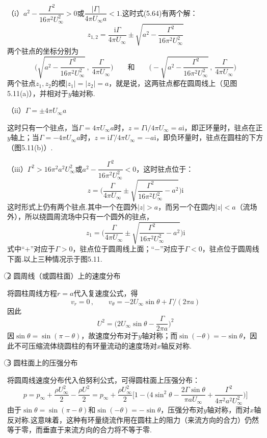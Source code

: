 （i）$a^{2}-\dfrac{\Gamma^{2}}{16\pi^{2}U_\infty^{2}}>0$或$\dfrac{|\Gamma|}{4\pi U_\infty a}<1$.这时式(5.64)有两个解：
\[
z_{1,2}=\frac{\mathrm{i}\Gamma}{4\pi U_\infty}\pm\sqrt{a^{2}-\frac{\Gamma^{2}}{16\pi^{2}U_\infty^{2}}}
\]
两个驻点的坐标分别为
\[
\Big(\sqrt{a^{2}-\frac{\Gamma^{2}}{16\pi^{2}U_\infty^{2}}}\,,\ \frac{\Gamma}{4\pi U_\infty}\Big)\qquad\text{和}\qquad\Big(-\sqrt{a^{2}-\frac{\Gamma^{2}}{16\pi^{2}U_\infty^{2}}}\,,\ \frac{\Gamma}{4\pi U_\infty}\Big)
\]
两个驻点$z_1,z_2$的模$|z_1|=|z_2|=a$，就是说，这两驻点都在圆周线上（见图5.11(a)），并相对于$y$轴对称.

（ii）$\Gamma=\pm 4\pi U_\infty a$

这时只有一个驻点，当$\Gamma=4\pi U_\infty a$时，$z=\Gamma\mathrm{i}/4\pi U_\infty=a\mathrm{i}$，即正环量时，驻点在正$y$轴上；当$\Gamma=-4\pi U_\infty a$时，$z=\mathrm{i}\Gamma/4\pi U_\infty=-a\mathrm{i}$，即负环量时，驻点在圆柱的下方（图5.11(b)）.

（iii）$\Gamma^{2}>16\pi^{2}a^{2}U_\infty^{2}$或$a^{2}-\dfrac{\Gamma^{2}}{16\pi^{2}U_\infty^{2}}<0$，这时驻点位于：
\[
z=\Big(\frac{\Gamma}{4\pi U_\infty}\pm\sqrt{\frac{\Gamma^{2}}{16\pi^{2}U_\infty^{2}}-a^{2}}\Big)\mathrm{i}
\]
这时形式上仍有两个驻点.其中一个在圆外$|z|>a$，而另一个在圆内$|z|<a$（流场外），所以绕圆周流场中只有一个圆外的驻点，
\[
z_1=\Big(\frac{\Gamma}{4\pi U_\infty}\pm\sqrt{\frac{\Gamma^{2}}{16\pi^{2}U_\infty^{2}}-a^{2}}\Big)\mathrm{i}
\]
式中“$+$”对应于$\Gamma>0$，驻点位于圆周线上面；“$-$”对应于$\Gamma<0$，驻点位于圆周线下面.以上三种情况示于图5.11.

\textcircled{2} 圆周线（或圆柱面）上的速度分布

将圆柱周线方程$r=a$代入复速度公式，得
\[
v_r=0\,,\qquad v_\theta=-2U_\infty\sin\theta+\Gamma\big/(2\pi a)
\]
因此
\[
U^{2}=\Big(2U_\infty\sin\theta-\frac{\Gamma}{2\pi a}\Big)^{2}
\]
因$\sin\theta=\sin(\pi-\theta)$，故速度分布对于$y$轴对称；而$\sin(-\theta)=-\sin\theta$，因此不可压缩流体绕圆柱的有环量流动的速度场对$x$轴反对称.

\textcircled{3} 圆柱面上的压强分布

将圆周线速度分布代入伯努利公式，可得圆柱面上压强分布：
\[
p=p_\infty+\frac{\rho U_\infty^{2}}{2}-\frac{\rho U^{2}}{2}=p_\infty+\frac{\rho U_\infty^{2}}{2}\bigg[1-\Big(4\sin^{2}\theta-\frac{2\Gamma\sin\theta}{\pi aU_\infty}+\frac{\Gamma^{2}}{4\pi^{2}a^{2}U_\infty^{2}}\Big)\bigg]
\]
由于$\sin\theta=\sin(\pi-\theta)$和$\sin(-\theta)=-\sin\theta$，压强分布对$y$轴对称，而对$x$轴反对称.这意味着，这种有环量绕流作用在圆柱上的阻力（来流方向的合力）仍然等于零，而垂直于来流方向的合力将不等于零.

